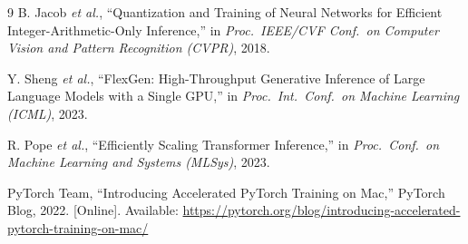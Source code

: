 \documentclass[conference]{IEEEtran}
\begin{document}
\begin{thebibliography}{9}
B. Jacob \textit{et al.}, ``Quantization and Training of Neural
Networks for Efficient Integer-Arithmetic-Only Inference,'' in
\textit{Proc.\ IEEE/CVF Conf.\ on Computer Vision and Pattern
Recognition (CVPR)}, 2018.

Y. Sheng \textit{et al.}, ``FlexGen: High-Throughput Generative
Inference of Large Language Models with a Single GPU,'' in
\textit{Proc.\ Int.\ Conf.\ on Machine Learning (ICML)}, 2023.

R. Pope \textit{et al.}, ``Efficiently Scaling Transformer Inference,''
in \textit{Proc.\ Conf.\ on Machine Learning and Systems (MLSys)},
2023.

PyTorch Team, ``Introducing Accelerated PyTorch Training on Mac,''
PyTorch Blog, 2022. [Online]. Available:
\url{https://pytorch.org/blog/introducing-accelerated-pytorch-training-on-mac/}

\end{thebibliography}
\end{document}
